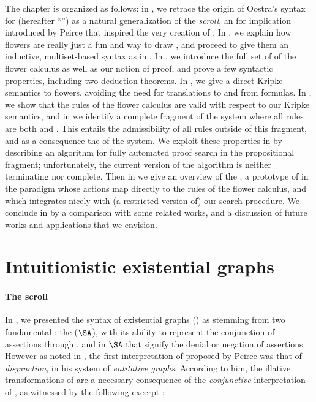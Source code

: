 The chapter is organized as follows: in , we retrace the origin of
Oostra's syntax for   (hereafter ``'') as a
natural generalization of the \emph{scroll}, an  for implication introduced
by Peirce that inspired the very creation of . In , we
explain how flowers are really just a fun and  way to draw
, and proceed to give them an inductive, multiset-based syntax as in
. In , we introduce the full set of  of the flower calculus as well as our notion of proof, and prove a few
syntactic properties, including two deduction theorems. In ,
we give a direct Kripke semantics to flowers, avoiding the need for translations
to and from formulas. In , we show that the rules of the
flower calculus are valid with respect to our Kripke semantics, and in
 we identify a complete fragment of the system where all
rules are both \emph{} and \emph{}. This entails the
admissibility of all rules outside of this fragment, and as a consequence the
 of the system. We exploit these properties in
 by describing an algorithm for fully automated proof
search in the propositional fragment; unfortunately, the current version of the
algorithm is neither terminating nor complete. Then in 
we give an overview of the , a prototype of  in the
 paradigm whose actions map directly to the rules of the flower
calculus, and which integrates nicely with (a restricted version of) our search
procedure. We conclude in  by a comparison with some related
works, and a discussion of future works and applications that we envision.


\section{Intuitionistic existential graphs}

\paragraph{The scroll}

In , we presented the syntax of existential graphs () as
stemming from two fundamental : the  ($\SA$),
with its ability to represent the conjunction of assertions through
\emph{}, and \emph{} in $\SA$ that signify the denial or
negation of assertions. However as noted in , the first
interpretation of  proposed by Peirce was that of
\emph{disjunction}, in his system of \emph{entitative graphs}. According to him,
the illative transformations of  are a necessary consequence of the
\emph{conjunctive} interpretation of , as witnessed by the
following excerpt :

